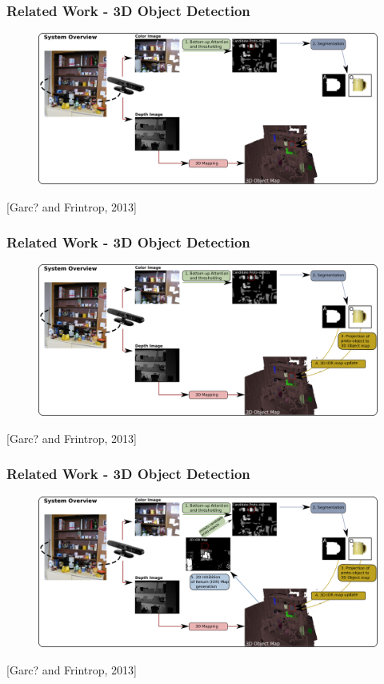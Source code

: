 \documentclass[t]{beamer} %
\begin{document}
\begin{frame}
	\frametitle{ Related Work - 3D Object Detection }
	\begin{figure}[h]
		\includegraphics[width=1\textwidth]{src/frintrop4.png}
	\end{figure}
	\centering
	\scriptsize [Garc? and Frintrop, 2013]
\end{frame}

\begin{frame}
	\frametitle{ Related Work - 3D Object Detection }
	\begin{figure}[h]
		\includegraphics[width=1\textwidth]{src/frintrop5.png}
	\end{figure}
	\centering
	\scriptsize [Garc? and Frintrop, 2013]
\end{frame}

\begin{frame}
	\frametitle{ Related Work - 3D Object Detection }
	\begin{figure}[h]
		\includegraphics[width=1\textwidth]{src/frintrop6.png}
	\end{figure}
	\centering
	\scriptsize [Garc? and Frintrop, 2013]
\end{frame}
\end{document}
